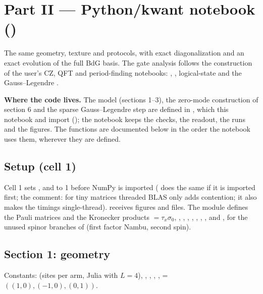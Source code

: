 \section{Part II --- Python/kwant notebook ()}

The same geometry, texture and protocols, with exact diagonalization and an exact evolution of the full BdG basis. The gate analysis
follows the construction of the user's CZ, QFT and period-finding notebooks: , , logical-state
 and the Gauss--Legendre .

\textbf{Where the code lives.} The model (sections 1--3), the zero-mode construction of section 6 and the sparse Gauss--Legendre step are
defined in , which this notebook and  import
(); the notebook keeps the checks, the readout, the runs and the figures. The functions are documented
below in the order the notebook uses them, wherever they are defined.

\subsection{Setup (cell 1)}

Cell 1 sets ,  and  to 1 before NumPy is imported
( does the same if it is imported first; the comment: for tiny matrices threaded BLAS only adds contention; it also makes the timings single-thread). 
receives figures and  files. The module defines the Pauli matrices  and the Kronecker products
 $=\tau_x\sigma_0$, , , , , , , , and ,  for the unused spinor branches of  (first factor Nambu,
second spin).

\subsection{Section 1: geometry}

Constants:  (sites per arm, Julia  with $L = 4$), , ,
, ,  = $((1,0), (-1,0), (0,1))$.

